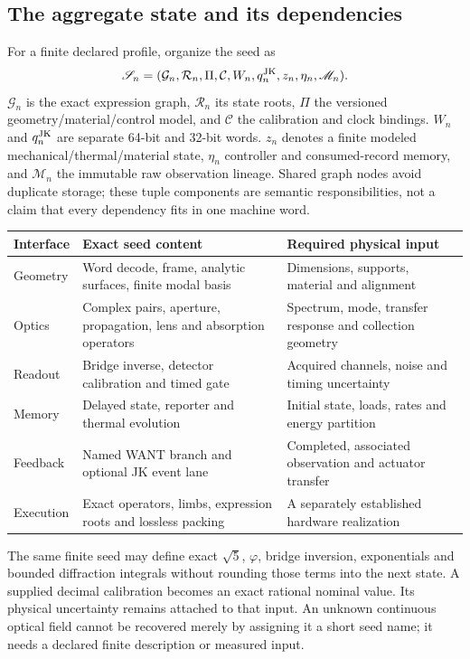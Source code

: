 \subsection{The aggregate state and its dependencies}
For a finite declared profile, organize the seed as
\begin{equation}
 \mathscr S_n=(\mathcal G_n,\mathcal R_n,\Pi,\mathcal C,
        W_n,q_n^{\rm JK},z_n,\eta_n,\mathscr M_n).
\end{equation}
$\mathcal G_n$ is the exact expression graph, $\mathcal R_n$ its state roots,
$\Pi$ the versioned geometry/material/control model, and $\mathcal C$ the
calibration and clock bindings. $W_n$ and $q_n^{\rm JK}$ are separate 64-bit
and 32-bit words. $z_n$ denotes a finite modeled mechanical/thermal/material
state, $\eta_n$ controller and consumed-record memory, and $\mathscr M_n$ the
immutable raw observation lineage. Shared graph nodes avoid duplicate storage;
these tuple components are semantic responsibilities, not a claim that every
dependency fits in one machine word.

\begin{center}\small
\begin{tabularx}{\linewidth}{@{}P{31mm}Y Y@{}}
\toprule Interface & Exact seed content & Required physical input\\\midrule
Geometry & Word decode, frame, analytic surfaces, finite modal basis & Dimensions, supports, material and alignment\\
Optics & Complex pairs, aperture, propagation, lens and absorption operators & Spectrum, mode, transfer response and collection geometry\\
Readout & Bridge inverse, detector calibration and timed gate & Acquired channels, noise and timing uncertainty\\
Memory & Delayed state, reporter and thermal evolution & Initial state, loads, rates and energy partition\\
Feedback & Named WANT branch and optional JK event lane & Completed, associated observation and actuator transfer\\
Execution & Exact operators, limbs, expression roots and lossless packing & A separately established hardware realization\\
\bottomrule
\end{tabularx}\end{center}

The same finite seed may define exact $\sqrt5$, $\varphi$, bridge inversion,
exponentials and bounded diffraction integrals without rounding those terms
into the next state. A supplied decimal calibration becomes an exact rational
nominal value. Its physical uncertainty remains attached to that input.
An unknown continuous optical field cannot be recovered merely by assigning
it a short seed name; it needs a declared finite description or measured input.

